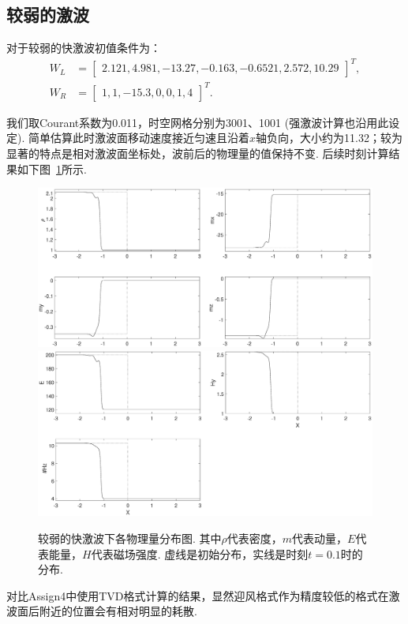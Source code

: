 \documentclass{article}
\begin{document}
\subsection{较弱的激波}
对于较弱的快激波初值条件为：
\begin{align}
W_L &= \left[\begin{array}{cccccc}
2.121,
4.981,
-13.27,
-0.163,
-0.6521,
2.572,
10.29
\end{array}\right]^T,
\nonumber\\
W_R &= \left[\begin{array}{ccccccc}
1,
1,
-15.3,
0,
0,
1,
4
\end{array}\right]^T. \label{Eqn:WFast}
\end{align}
\par
我们取Courant系数为0.011，时空网格分别为3001、1001 (强激波计算也沿用此设定). 简单估算此时激波面移动速度接近匀速且沿着$x$轴负向，大小约为11.32；较为显著的特点是相对激波面坐标处，波前后的物理量的值保持不变. 后续时刻计算结果如下图~\ref{fig:2.1mix}所示.
\begin{figure}[H]
    \centering
    \includegraphics[width=.75\textwidth]{2.1Up1.eps}
    \includegraphics[width=.75\textwidth]{2.1Up2.eps}
    \caption{较弱的快激波下各物理量分布图. 其中$\rho$代表密度，$m$代表动量，$E$代表能量，$H$代表磁场强度.  虚线是初始分布，实线是时刻$t=0.1$时的分布.}
    \label{fig:2.1mix}
\end{figure}
\par
对比Assign4中使用TVD格式计算的结果，显然迎风格式作为精度较低的格式在激波面后附近的位置会有相对明显的耗散.
\end{document}
